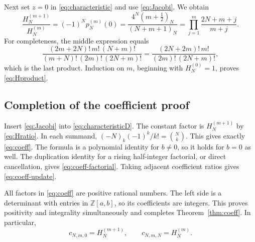 \documentclass[11pt,a4paper]{article}
\numberwithin{equation}{section}
\theoremstyle{definition}
\theoremstyle{remark}
\newcommand{\ZZ}{\mathbb Z}
\newcommand{\HH}[2]{H_{#1}^{(#2)}}
\begin{document}
Next set $z=0$ in \eqref{eq:characteristic} and use
\eqref{eq:Jacobi}.  We obtain
\begin{equation}\label{eq:Hratio}
 \frac{\HH{N}{m+1}}{\HH{N}{m}}
 =(-1)^Np_N^{(m)}(0)
 =\frac{4^N(m+\tfrac12)_N}{(N+m+1)_N}
 =\prod_{j=1}^{m}\frac{2N+m+j}{m+j}.
\end{equation}
For completeness, the middle expression equals
\[
 \frac{(2m+2N)!\,m!\,(N+m)!}
      {(m+N)!\,(2m)!\,(2N+m)!}
 =\frac{(2N+2m)!\,m!}{(2m)!\,(2N+m)!},
\]
which is the last product.  Induction on $m$, beginning with
$H_N^{(0)}=1$, proves \eqref{eq:Hproduct}.

\subsection{Completion of the coefficient proof}
Insert \eqref{eq:Jacobi} into \eqref{eq:characteristicD}.
The constant factor is $H_N^{(m+1)}$ by \eqref{eq:Hratio}.
In each summand, $(-N)_k(-1)^k/k!=\binom Nk$.  This gives exactly
\eqref{eq:coeff}.  The formula is a polynomial identity for $b\ne0$,
so it holds for $b=0$ as well.  The duplication identity for a rising
half-integer factorial, or direct cancellation, gives
\eqref{eq:coeff-factorial}.  Taking adjacent coefficient ratios gives
\eqref{eq:coeff-update}.

All factors in \eqref{eq:coeff} are positive rational numbers.  The
left side is a determinant with entries in $\ZZ[a,b]$, so its
coefficients are integers.  This proves positivity and integrality
simultaneously and completes Theorem~\ref{thm:coeff}.
In particular,
\begin{equation}\label{eq:extremalcoeff}
 c_{N,m,0}=\HH{N}{m+1},\qquad c_{N,m,N}=\HH{N}{m}.
\end{equation}
\end{document}
